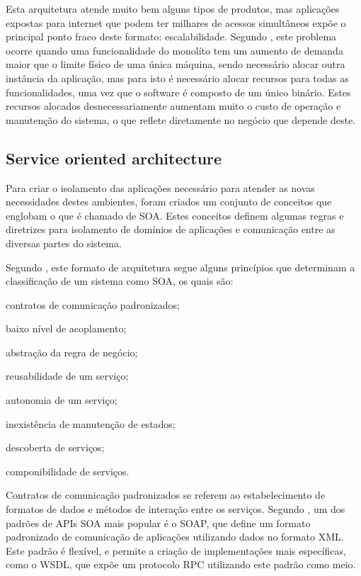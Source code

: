 Esta arquitetura atende muito bem alguns tipos de produtos, mas aplicações
expostas para internet que podem ter milhares de acessos simultâneos expõe o
principal ponto fraco deste formato: escalabilidade. Segundo
, este problema ocorre quando uma funcionalidade do
monolíto tem um aumento de demanda maior que o limite físico de uma única
máquina, sendo necessário alocar outra instância da aplicação, mas para isto
é necessário alocar recursos para todas as funcionalidades, uma vez que o
software é composto de um único binário. Estes recursos alocados
desnecessariamente aumentam muito o custo de operação e manutenção do
sistema, o que reflete diretamente no negócio que depende deste.

\subsection{Service oriented architecture}

Para criar o isolamento das aplicações necessário para atender as novas
necessidades destes ambientes, foram criados um conjunto de conceitos
que englobam o que é chamado de \ac{SOA}. Estes conceitos definem algumas
regras e diretrizes para isolamento de domínios de aplicações e comunicação
entre as diversas partes do sistema.

Segundo , este formato de arquitetura segue alguns
princípios que determinam a classificação de um sistema como \ac{SOA},
os quais são:

\begin{alineas}
  \item contratos de comunicação padronizados;
  \item baixo nível de acoplamento;
  \item abstração da regra de negócio;
  \item reusabilidade de um serviço;
  \item autonomia de um serviço;
  \item inexistência de manutenção de estados;
  \item descoberta de serviços;
  \item componibilidade de serviços.
\end{alineas}

Contratos de comunicação padronizados se referem ao estabelecimento de
formatos de dados e métodos de interação entre os serviços. Segundo
, um dos padrões de APIs SOA mais popular é o
\ac{SOAP}, que define um formato padronizado de comunicação de
aplicações utilizando dados no formato \ac{XML}. Este padrão é flexível,
e permite a criação de implementações mais específicas, como o \ac{WSDL},
que expõe um protocolo \ac{RPC} utilizando este padrão como meio.

